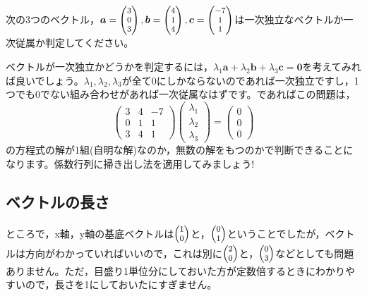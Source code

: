 \documentclass{ltjsbook}
\begin{document}
\begin{reidai}{}{}
	次の3つのベクトル，$\bm{a} = \footnotesize\begin{pmatrix}3\\0\\3\end{pmatrix},\bm{b}=\footnotesize\begin{pmatrix}4\\1\\4\end{pmatrix},\bm{c}=\footnotesize\begin{pmatrix}-7\\1\\1\end{pmatrix}$は一次独立なベクトルか一次従属か判定してください。
\end{reidai}
\begin{hinto}{}{}
	ベクトルが一次独立かどうかを判定するには，$\lambda_1 \bm{a} + \lambda_2 \bm{b} + \lambda_3 \bm{c} = \bm{0}$を考えてみれば良いでしょう。$\lambda_1,\lambda_2,\lambda_3$が全て0にしかならないのであれば一次独立ですし，1つでも0でない組み合わせがあれば一次従属なはずです。であればこの問題は，
	\[
		\begin{pmatrix} 3 & 4 & -7\\ 0 & 1 & 1 \\ 3 & 4 & 1 \end{pmatrix}
		\begin{pmatrix}\lambda_1 \\ \lambda_2 \\ \lambda_3 \end{pmatrix} =
		\begin{pmatrix}0 \\ 0 \\ 0 \end{pmatrix}
	\]
	の方程式の解が1組(自明な解)なのか，無数の解をもつのかで判断できることになります。係数行列に掃き出し法を適用してみましょう!
\end{hinto}

\subsection{ベクトルの長さ}
ところで，x軸，y軸の基底ベクトルは$\footnotesize\begin{pmatrix}1\\0\end{pmatrix}$と，$\footnotesize\begin{pmatrix}0 \\ 1\end{pmatrix}$ということでしたが，ベクトルは方向がわかっていればいいので，これは別に$\footnotesize\begin{pmatrix}2\\0\end{pmatrix}$と，$\footnotesize\begin{pmatrix}0 \\ 3\end{pmatrix}$などとしても問題ありません。ただ，目盛り1単位分にしておいた方が定数倍するときにわかりやすいので，長さを1にしておいたにすぎません。
\end{document}
